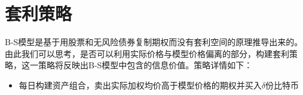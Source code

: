     \section{套利策略}
    B-S模型是基于用股票和无风险债券复制期权而没有套利空间的原理推导出来的。由此我们可以思考，是否可以利用实际价格与模型价格偏离的部分，构建套利策略，这一策略将反映出B-S模型中包含的信息价值。策略详情如下：
    \begin{itemize}
        \item 每日构建资产组合，卖出实际加权均价高于模型价格的期权并买入$\delta$份比特币
    \end{itemize}
